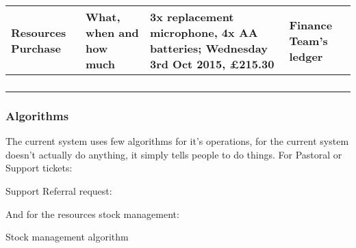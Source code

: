\begin{table}[]
\begin{tabular}{llll}
\multicolumn{1}{|l|}{Resources Purchase} & \multicolumn{1}{l|}{What, when and how much}  & \multicolumn{1}{l|}{3x replacement microphone, 4x AA batteries; Wednesday 3rd Oct 2015, £215.30}     & \multicolumn{1}{l|}{Finance Team's ledger}             \\ \hline
\multicolumn{1}{|l|}{}                   & \multicolumn{1}{l|}{}                         & \multicolumn{1}{l|}{}                                                                                & \multicolumn{1}{l|}{}                                  \\ \hline
                                         &                                               &                                                                                                      &                                                        \\
                                         &                                               &                                                                                                      &                                                        \\
                                         &                                               &                                                                                                      &
\end{tabular}
\end{table}


\subsubsection{Algorithms}
 The current system uses few algorithms for it's operations, for the current system doesn't actually do anything, it simply tells people to do things.
For Pastoral or Support tickets:
\begin{algorithm}[H]
	\caption{Support Referral request:}
	\begin{algorithmic}[1]
		\Repeat
	\end{algorithmic}
\end{algorithm}

And for the resources stock management:
\begin{algorithm}[H]
	\caption{Stock management algorithm}
	\begin{algorithmic}[1]
	\end{algorithmic}
\end{algorithm}

